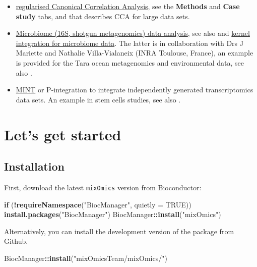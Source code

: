 \documentclass[]{book}
\newenvironment{Shaded}{\begin{snugshade}}{\end{snugshade}}
\newcommand{\ControlFlowTok}[1]{\textcolor[rgb]{0.13,0.29,0.53}{\textbf{#1}}}
\newcommand{\DataTypeTok}[1]{\textcolor[rgb]{0.13,0.29,0.53}{#1}}
\newcommand{\KeywordTok}[1]{\textcolor[rgb]{0.13,0.29,0.53}{\textbf{#1}}}
\newcommand{\NormalTok}[1]{#1}
\newcommand{\OperatorTok}[1]{\textcolor[rgb]{0.81,0.36,0.00}{\textbf{#1}}}
\newcommand{\OtherTok}[1]{\textcolor[rgb]{0.56,0.35,0.01}{#1}}
\newcommand{\StringTok}[1]{\textcolor[rgb]{0.31,0.60,0.02}{#1}}
\begin{document}
\begin{itemize}
\item
  \href{http://www.mixOmics.org}{regularised Canonical Correlation Analysis}, see the \textbf{Methods} and \textbf{Case study} tabs, and \citep{Gon08} that describes CCA for large data sets.
\item
  \href{http://www.mixOmics.org/mixmc}{Microbiome (16S, shotgun metagenomics) data analysis}, see also \citep{Lec16} and \href{http://mixomics.org/mixkernel}{kernel integration for microbiome data}. The latter is in collaboration with Drs J Mariette and Nathalie Villa-Vialaneix (INRA Toulouse, France), an example is provided for the Tara ocean metagenomics and environmental data, see also \citep{Mar17}.
\item
  \href{http://mixomics.org/mixmint/}{MINT} or P-integration to integrate independently generated transcriptomics data sets. An example in stem cells studies, see also \citep{Roh16}.
\end{itemize}

\hypertarget{start}{%
\chapter{Let's get started}\label{start}}

\hypertarget{installation}{%
\section{Installation}\label{installation}}

First, download the latest \texttt{mixOmics} version from Bioconductor:

\begin{Shaded}
\begin{Highlighting}[]
\ControlFlowTok{if}\NormalTok{ (}\OperatorTok{!}\KeywordTok{requireNamespace}\NormalTok{(}\StringTok{"BiocManager"}\NormalTok{, }\DataTypeTok{quietly =} \OtherTok{TRUE}\NormalTok{))}
    \KeywordTok{install.packages}\NormalTok{(}\StringTok{"BiocManager"}\NormalTok{)}
\NormalTok{ BiocManager}\OperatorTok{::}\KeywordTok{install}\NormalTok{(}\StringTok{"mixOmics"}\NormalTok{)}
\end{Highlighting}
\end{Shaded}

Alternatively, you can install the development version of the package from Github.

\begin{Shaded}
\begin{Highlighting}[]
\NormalTok{BiocManager}\OperatorTok{::}\KeywordTok{install}\NormalTok{(}\StringTok{"mixOmicsTeam/mixOmics/"}\NormalTok{)}
\end{Highlighting}
\end{Shaded}
\end{document}
